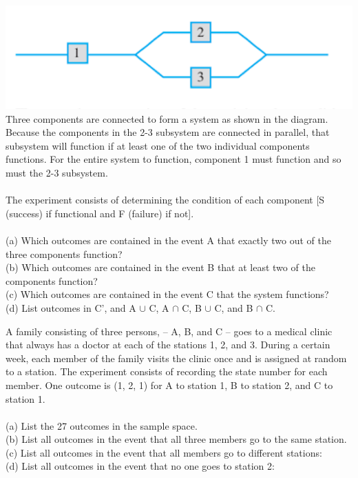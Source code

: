 \documentclass[12pt,letterpaper]{hmcpset}
\begin{document}

\begin{problem}[2.1.3]
\includegraphics[scale=1]{Nov_3_1.png}\\
    Three components are connected to form a system as shown in the diagram. Because the components in the 2-3 subsystem are connected in parallel, that subsystem will function if at least one of the two individual components functions. For the entire system to function, component 1 must function and so must the 2-3 subsystem.\\ \\
    The experiment consists of determining the condition of each component [S (success) if functional and F (failure) if not].
\\ \\
(a) Which outcomes are contained in the event A that exactly two out of the three components function?
\\
(b) Which outcomes are contained in the event B that at least two of the components function?
\\
(c) Which outcomes are contained in the event C that the system functions?
\\
(d) List outcomes in C’, and A $\cup$ C, A $\cap$ C, B $\cup$ C, and B $\cap$ C.

\end{problem}

\begin{solution}

\end{solution}
\newpage

\begin{problem}[2.1.5]

A family consisting of three persons, – A, B, and C – goes to a medical clinic that always has a doctor at each of the stations 1, 2, and 3. During a certain week, each member of the family visits the clinic once and is assigned at random to a station. The experiment consists of recording the state number for each member. One outcome is (1, 2, 1) for A to station 1, B to station 2, and C to station 1. 
\\ \\
(a) List the 27 outcomes in the sample space.
\\
(b) List all outcomes in the event that all three members go to the same station.
\\
(c) List all outcomes in the event that all members go to different stations:
\\
(d) List all outcomes in the event that no one goes to station 2:



\end{problem}
\end{document}
